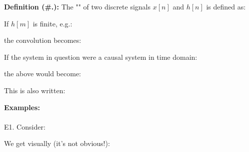 	\textbf{Definition (\#\thesection.\mydef):} The "" of two discrete signals $x[n]$ and $h[n]$ is defined as:
	
	If $h[m]$ is finite, e.g.:
	
	the convolution becomes:
	
	If the system in question were a causal system in time domain:
	
	the above would become:
	
	This is also written:
	
	\begin{tcolorbox}[colframe=black,colback=white,sharp corners,breakable]
	\textbf{{\Large {}}Examples:}\\\\
	E1. Consider:
	
	We get visually (it's not obvious!):
	\begin{figure}[H]
		\centering
		\begin{tikzpicture}[x=0.75pt,y=0.75pt,yscale=-1,xscale=1]
		

\end{tikzpicture}
\end{figure}
\end{tcolorbox}
